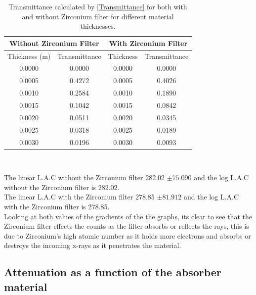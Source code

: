 \documentclass[12pt]{article}
\begin{document}
\begin{table}[H]
\begin{center}
 \footnotesize
 \begin{tabular}{|c|c||c|c|}
 \hline
 \multicolumn{2}{|c|}{Without Zirconium Filter} & \multicolumn{2}{|c|}{With Zirconium Filter} \\
 \hline 
 Thickness (m) & Transmittance & Thickness & Transmittance\\
 \hline \hline
  0.0000  & 0.0000 & 0.0000 & 0.0000 \\
  \hline
  0.0005 & 0.4272 & 0.0005 & 0.4026 \\
 \hline 
  0.0010  & 0.2584 & 0.0010 & 0.1890   \\
 \hline
  0.0015  & 0.1042 & 0.0015 & 0.0842  \\
 \hline 
  0.0020  & 0.0511 & 0.0020 & 0.0345  \\
 \hline
  0.0025  & 0.0318 & 0.0025 & 0.0189  \\
 \hline 
  0.0030  & 0.0196 & 0.0030 & 0.0093  \\
 \hline
 \end{tabular} \\ 
 \caption{Transmittance calculated by \cref{Transmittance} for both with and without Zirconium filter for different material thicknesses.}
 \label{Thickness Transmittance}
\end{center}
\end{table}

The linear L.A.C without the Zirconium filter 282.02 $\pm75.090$ and the log L.A.C without the Zirconium filter is 282.02. \\

The linear L.A.C with the Zirconium filter 278.85 $\pm81.912$ and the log L.A.C with the Zirconium filter is 278.85. \\

Looking at both values of the gradients of the the graphs, its clear to see that the Zirconium filter effects the counts as the filter absorbs or reflects the rays, this is due to Zirconium's high atomic number as it holds more electrons and absorbs or destroys the incoming x-rays as it penetrates the material.\\

\subsection{Attenuation as a function of the absorber material}
\label{EAttenuation as a function of the absorber material SubSection}
\end{document}

